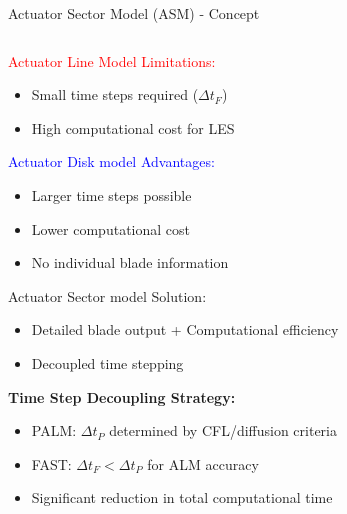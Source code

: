 \documentclass[aspectratio=1610]{beamer}
\begin{document}
\begin{frame}{Actuator Sector Model (ASM) - Concept}
    \begin{columns}
        \begin{column}{0.6\textwidth}
                \textcolor{red}{Actuator Line Model Limitations:}
                \begin{itemize}
                \small
                    \item Small time steps required ($\Delta t_F$)
                    \item High computational cost for LES
                \end{itemize}
                
                \textcolor{blue}{Actuator Disk model Advantages:}
                \begin{itemize}
                \small
                    \item Larger time steps possible
                    \item Lower computational cost
                    \item No individual blade information
                \end{itemize}
                
                \textcolor{green!60!black}{Actuator Sector model Solution:}
                \begin{itemize}
                \small
                    \item Detailed blade output + Computational efficiency
                    \item Decoupled time stepping
                \end{itemize}

            
            \textbf{Time Step Decoupling Strategy:}
            \begin{itemize}
            \small
                \item PALM: $\Delta t_P$ determined by CFL/diffusion criteria
                \item FAST: $\Delta t_F < \Delta t_P$ for ALM accuracy
                \item Significant reduction in total computational time
            \end{itemize}
        \end{column}
        
        \begin{column}{0.4\textwidth}
        \begin{center}
\end{center}
\end{column}
\end{columns}
\end{frame}
\end{document}
